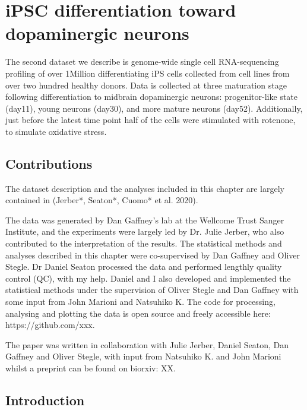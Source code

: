 \section{iPSC differentiation toward dopaminergic neurons}

The second dataset we describe is genome-wide single cell RNA-sequencing profiling of over 1Million differentiating iPS cells collected from cell lines from over two hundred healthy donors. Data is collected at three maturation stage following differentiation to midbrain dopaminergic neurons: progenitor-like state (day11), young neurons (day30), and more mature neurons (day52). Additionally, just before the latest time point half of the cells were stimulated with rotenone, to simulate oxidative stress. 

\vspace{5mm}

\subsection{Contributions}

The dataset description and the analyses included in this chapter are largely contained in (Jerber*, Seaton*, Cuomo* et al. 2020).

\vspace{5mm}

The data was generated by Dan Gaffney’s lab at the Wellcome Trust Sanger Institute, and the experiments were largely led by Dr. Julie Jerber, who also contributed to the interpretation of the results. The statistical methods and analyses described in this chapter were co-supervised by Dan Gaffney and Oliver Stegle. Dr Daniel Seaton processed the data and performed lengthly quality control (QC), with my help. Daniel and I also developed and implemented the statistical methods under the supervision of Oliver Stegle and Dan Gaffney with some input from John Marioni and Natsuhiko K. The code for processing, analysing and plotting the data is open source and freely accessible here: https://github.com/xxx.

\vspace{5mm}

The paper was written in collaboration with Julie Jerber, Daniel Seaton, Dan Gaffney and Oliver Stegle, with input from Natsuhiko K. and John Marioni whilst a preprint can be found on biorxiv: XX.


\subsection{Introduction}

